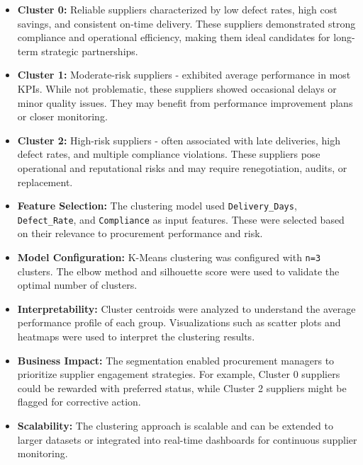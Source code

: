 \documentclass[10pt, twocolumn]{article}
\begin{document}
\begin{itemize}
    \item \textbf{Cluster 0:} Reliable suppliers characterized by low defect rates, high cost savings, and consistent on-time delivery. These suppliers demonstrated strong compliance and operational efficiency, making them ideal candidates for long-term strategic partnerships.

    \item \textbf{Cluster 1:} Moderate-risk suppliers - exhibited average performance in most KPIs. While not problematic, these suppliers showed occasional delays or minor quality issues. They may benefit from performance improvement plans or closer monitoring.

    \item \textbf{Cluster 2:} High-risk suppliers - often associated with late deliveries, high defect rates, and multiple compliance violations. These suppliers pose operational and reputational risks and may require renegotiation, audits, or replacement.

    \item \textbf{Feature Selection:} The clustering model used \texttt{Delivery\_Days}, \texttt{Defect\_Rate}, and \texttt{Compliance} as input features. These were selected based on their relevance to procurement performance and risk.

    \item \textbf{Model Configuration:} K-Means clustering was configured with \texttt{n=3} clusters. The elbow method and silhouette score were used to validate the optimal number of clusters.

    \item \textbf{Interpretability:} Cluster centroids were analyzed to understand the average performance profile of each group. Visualizations such as scatter plots and heatmaps were used to interpret the clustering results.

    \item \textbf{Business Impact:} The segmentation enabled procurement managers to prioritize supplier engagement strategies. For example, Cluster 0 suppliers could be rewarded with preferred status, while Cluster 2 suppliers might be flagged for corrective action.

    \item \textbf{Scalability:} The clustering approach is scalable and can be extended to larger datasets or integrated into real-time dashboards for continuous supplier monitoring.
\end{itemize}
\end{document}
